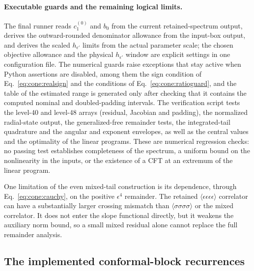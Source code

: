 \documentclass[11pt,a4paper]{article}
\numberwithin{equation}{section}
\begin{document}
\paragraph{Executable guards and the remaining logical limits.} The final runner reads $c_1^{(0)}$ and $b_0$ from the
current retained-spectrum output, derives the outward-rounded denominator allowance from the input-box output, and
derives the scaled $h_{\epsilon'}$ limits from the actual parameter scale; the chosen objective allowance and the
physical $h_{\epsilon'}$ window are explicit settings in one configuration file. The numerical guards raise exceptions
that stay active when Python assertions are disabled, among them the sign condition of Eq.~\eqref{eq:cone:realsign} and
the conditions of Eq.~\eqref{eq:cone:ratioguard}, and the table of the estimated range is generated only after checking
that it contains the computed nominal and doubled-padding intervals. The verification script tests the level-40 and
level-48 arrays (residual, Jacobian and padding), the normalized radial-state output, the generalized-free remainder
tests, the integrated-tail quadrature and the angular and exponent envelopes, as well as the central values and the
optimality of the linear programs. These are numerical regression checks: no passing test establishes completeness of
the spectrum, a uniform bound on the nonlinearity in the inputs, or the existence of a CFT at an extremum of the linear
program.

One limitation of the even mixed-tail construction is its dependence, through Eq.~\eqref{eq:cone:cauchy}, on the
positive $\epsilon^4$ remainder. The retained $\langle\epsilon\epsilon\epsilon\epsilon\rangle$ correlator can have a
substantially larger crossing mismatch than $\langle\sigma\sigma\sigma\sigma\rangle$ or the mixed correlator. It does
not enter the slope functional directly, but it weakens the auxiliary norm bound, so a small mixed residual alone
cannot replace the full remainder analysis.

\subsection{The implemented conformal-block recurrences}\label{app:cone:recurrences}
\end{document}
